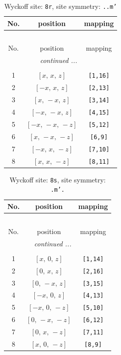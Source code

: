 \documentclass[fleqn,8pt]{jsarticle}
\begin{document}
\begin{longtable}{ccc}
\caption{Wyckoff site: {\tt 8r}, site symmetry: {\tt ..m'}}
 \\
 \hline \hline
No. & position & mapping \\ \hline \endfirsthead

\multicolumn{2}{l}{\tablename\ \thetable{}} \\
 \hline \hline
No. & position & mapping \\ \hline \endhead

 \hline \hline
\multicolumn{2}{r}{\footnotesize\it continued ...} \\ \endfoot

 \hline \hline
\multicolumn{2}{r}{} \\ \endlastfoot

1 & $\left[ x,\, x,\, z \right]$ & {\tt [1,16]} \\ \hline
2 & $\left[ - x,\, x,\, z \right]$ & {\tt [2,13]} \\ \hline
3 & $\left[ x,\, - x,\, z \right]$ & {\tt [3,14]} \\ \hline
4 & $\left[ - x,\, - x,\, z \right]$ & {\tt [4,15]} \\ \hline
5 & $\left[ - x,\, - x,\, - z \right]$ & {\tt [5,12]} \\ \hline
6 & $\left[ x,\, - x,\, - z \right]$ & {\tt [6,9]} \\ \hline
7 & $\left[ - x,\, x,\, - z \right]$ & {\tt [7,10]} \\ \hline
8 & $\left[ x,\, x,\, - z \right]$ & {\tt [8,11]} \\
\end{longtable}
\renewcommand{\arraystretch}{1.2}
\begin{longtable}{ccc}
\caption{Wyckoff site: {\tt 8s}, site symmetry: {\tt .m'.}}
 \\
 \hline \hline
No. & position & mapping \\ \hline \endfirsthead

\multicolumn{2}{l}{\tablename\ \thetable{}} \\
 \hline \hline
No. & position & mapping \\ \hline \endhead

 \hline \hline
\multicolumn{2}{r}{\footnotesize\it continued ...} \\ \endfoot

 \hline \hline
\multicolumn{2}{r}{} \\ \endlastfoot

1 & $\left[ x,\, 0,\, z \right]$ & {\tt [1,14]} \\ \hline
2 & $\left[ 0,\, x,\, z \right]$ & {\tt [2,16]} \\ \hline
3 & $\left[ 0,\, - x,\, z \right]$ & {\tt [3,15]} \\ \hline
4 & $\left[ - x,\, 0,\, z \right]$ & {\tt [4,13]} \\ \hline
5 & $\left[ - x,\, 0,\, - z \right]$ & {\tt [5,10]} \\ \hline
6 & $\left[ 0,\, - x,\, - z \right]$ & {\tt [6,12]} \\ \hline
7 & $\left[ 0,\, x,\, - z \right]$ & {\tt [7,11]} \\ \hline
8 & $\left[ x,\, 0,\, - z \right]$ & {\tt [8,9]} \\
\end{longtable}
\end{document}
